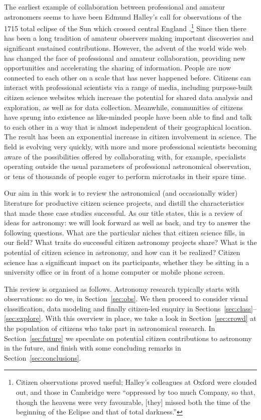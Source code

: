 \documentclass{ar2e}
\def\Sref#1{Section~\ref{#1}\xspace}
\begin{document}
The earliest
example of collaboration between 
professional and amateur astronomers seems to
have been Edmund Halley's call for observations of the 1715 total eclipse of the
Sun which crossed central England \citep{Halley}.\footnote{Citizen observations proved useful; Halley's colleagues at
Oxford were clouded out, and those in Cambridge were ``oppressed by too much
Company, so that, though the heavens were very favourable, [they] missed both
the time of the beginning of the Eclipse and that of total darkness.''}  Since
then there has been a long tradition of amateur observers
making important discoveries and significant sustained contributions. However,
the advent of the world wide web has changed the face of professional and
amateur collaboration, providing new opportunities and accelerating the sharing
of information. People are now connected to each other on a scale that has never
happened before. Citizens can interact with professional scientists via a range
of media, including purpose-built citizen science websites which
increase the potential for shared data analysis and exploration, as well as for
data collection. Meanwhile, communities of citizens have sprung into existence
as like-minded people have been able to find and talk to each other in a way
that is almost independent of their geographical location. The result has been
an exponential increase in citizen involvement in science. The field is evolving
very quickly, with more and more professional scientists becoming aware of the
possibilities offered by collaborating with, for example, specialists operating
outside the usual parameters of professional astronomical observation, or tens
of thousands of people eager to perform microtasks in their spare time.  

Our aim in this work is to review the astronomical (and occasionally wider)
literature for productive citizen science projects, and distill the
characteristics that made these case studies successful.  As our title states,
this is a review of ideas for astronomy: we will look forward as well as back,
and try to answer the following questions. What are the particular niches that
citizen science fills, in our field? What traits do successful citizen astronomy
projects share? What is the potential of citizen science in
astronomy, and how can it be realized?  Citizen science has a significant impact
on its participants,  whether they be sitting in a university office or in front
of a home computer or mobile phone screen. 

This review is organised as follows. Astronomy research typically starts with
observations: so do we, in \Sref{sec:obs}. We then proceed to consider visual
classification, data modeling and finally citizen-led enquiry in 
Sections~\ref{sec:class}--\ref{sec:explore}. With this overview in place, we
take a look in \Sref{sec:crowd} at the population of citizens who take part in
astronomical research. 
In \Sref{sec:future} we speculate on potential citizen contributions to
astronomy in the future, and finish with some
concluding remarks in \Sref{sec:conclusions}.
\end{document}
